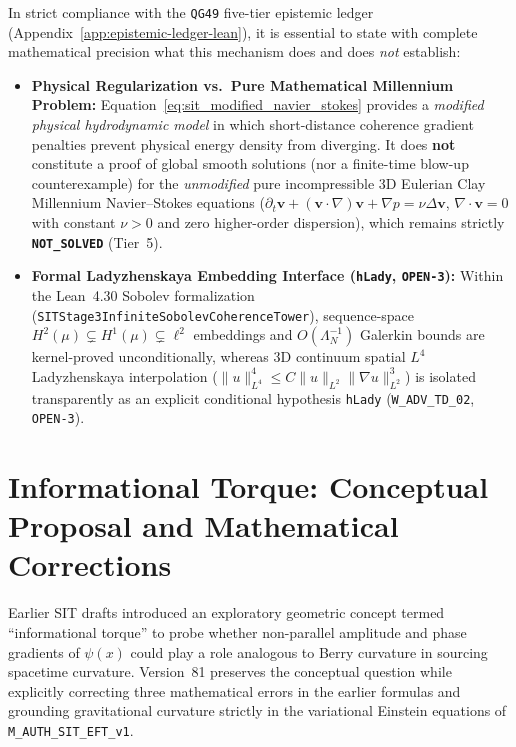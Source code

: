 In strict compliance with the \texttt{QG49} five-tier epistemic ledger (Appendix~\ref{app:epistemic-ledger-lean}), it is essential to state with complete mathematical precision what this mechanism does and does \emph{not} establish:
\begin{itemize}
  \item \textbf{Physical Regularization vs.\ Pure Mathematical Millennium Problem:} Equation~\eqref{eq:sit_modified_navier_stokes} provides a \emph{modified physical hydrodynamic model} in which short-distance coherence gradient penalties prevent physical energy density from diverging. It does \textbf{not} constitute a proof of global smooth solutions (nor a finite-time blow-up counterexample) for the \emph{unmodified} pure incompressible 3D Eulerian Clay Millennium Navier--Stokes equations ($\partial_t\mathbf{v} + (\mathbf{v}\cdot\nabla)\mathbf{v} + \nabla p = \nu\Delta\mathbf{v}$, $\nabla\cdot\mathbf{v} = 0$ with constant $\nu > 0$ and zero higher-order dispersion), which remains strictly \textbf{\texttt{NOT\_SOLVED}} (Tier~5).
  \item \textbf{Formal Ladyzhenskaya Embedding Interface (\texttt{hLady}, \texttt{OPEN-3}):} Within the Lean~4.30 Sobolev formalization (\texttt{SITStage3\allowbreak{}Infinite\allowbreak{}Sobolev\allowbreak{}Coherence\allowbreak{}Tower}), sequence-space $H^2(\mu) \subsetneq H^1(\mu) \subsetneq \ell^2$ embeddings and $O(\Lambda_N^{-1})$ Galerkin bounds are kernel-proved unconditionally, whereas 3D continuum spatial $L^4$ Ladyzhenskaya interpolation ($\|u\|_{L^4}^4 \le C\|u\|_{L^2}\|\nabla u\|_{L^2}^3$) is isolated transparently as an explicit conditional hypothesis \texttt{hLady} (\texttt{W\_ADV\_TD\_02}, \texttt{OPEN-3}).
\end{itemize}

\section{Informational Torque: Conceptual Proposal and Mathematical Corrections}
\label{sec:informational-torque}
\label{sec:informational_torque}

Earlier SIT drafts introduced an exploratory geometric concept termed ``informational torque'' to probe whether non-parallel amplitude and phase gradients of $\psi(x)$ could play a role analogous to Berry curvature in sourcing spacetime curvature. Version~81 preserves the conceptual question while explicitly correcting three mathematical errors in the earlier formulas and grounding gravitational curvature strictly in the variational Einstein equations of \texttt{M\_AUTH\_SIT\_EFT\_v1}.

